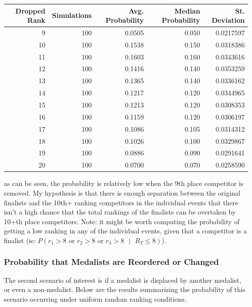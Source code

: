 \documentclass[12pt]{article}
\begin{document}
\begin{tabular}{r|r|r|r|r}
\hline
Dropped Rank & Simulations & Avg. Probability & Median Probability & St. Deviation\\
\hline
9 & 100 & 0.0505 & 0.050 & 0.0217597\\
\hline
10 & 100 & 0.1538 & 0.150 & 0.0318386\\
\hline
11 & 100 & 0.1603 & 0.160 & 0.0343616\\
\hline
12 & 100 & 0.1416 & 0.140 & 0.0353259\\
\hline
13 & 100 & 0.1365 & 0.140 & 0.0336162\\
\hline
14 & 100 & 0.1217 & 0.120 & 0.0344965\\
\hline
15 & 100 & 0.1213 & 0.120 & 0.0308353\\
\hline
16 & 100 & 0.1159 & 0.120 & 0.0306197\\
\hline
17 & 100 & 0.1086 & 0.105 & 0.0314312\\
\hline
18 & 100 & 0.1026 & 0.100 & 0.0329867\\
\hline
19 & 100 & 0.0886 & 0.090 & 0.0291641\\
\hline
20 & 100 & 0.0700 & 0.070 & 0.0258590\\
\hline
\end{tabular}

as can be seen, the probability is relatively low when the 9th place
competitor is removed. My hypothesis is that there is enough separation
between the original finalists and the 10th+ ranking competitors in the
individual events that there isn't a high chance that the total rankings
of the finalists can be overtaken by 10+th place competitors. Note: it
might be worth computing the probability of getting a low ranking in any
of the individual events, given that a competitor is a finalist (ie:
\(P(r_1 > 8 \text{ or } r_2 > 8 \text{ or } r_3 > 8 \text{ }|\text{ } R_T \leq 8)\)).

\hypertarget{probability-that-medalists-are-reordered-or-changed}{%
\subsubsection{Probability that Medalists are Reordered or
Changed}\label{probability-that-medalists-are-reordered-or-changed}}

The second scenario of interest is if a medalist is displaced by another
medalist, or even a non-medalist. Below are the results summarizing the
probability of this scenario occurring under uniform random ranking
conditions.
\end{document}
